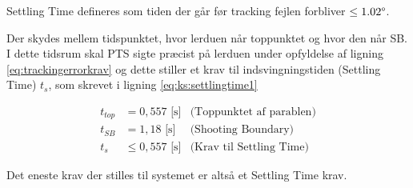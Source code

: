 Settling Time defineres som tiden der går før tracking fejlen forbliver \(\leq 1.02 \degree\).

Der skydes mellem tidspunktet, hvor lerduen når toppunktet og hvor den når SB.
I dette tidsrum skal PTS sigte præcist på lerduen under opfyldelse af ligning \ref{eq:trackingerrorkrav} og dette 
stiller et krav til indsvingningstiden (Settling Time) \(t_s\), som skrevet i ligning \ref{eq:ks:settlingtime1}

\begin{align}
  t_{top} &= 0,557\text{ [s]} &\text{(Toppunktet af parablen)}
  \label{eq:ks:toppunktstid}
  \\
   t_{SB} &= 1,18\text{ [s]} &\text{(Shooting Boundary)}
  \label{eq:ks:toppunktstid}
  \\
  t_{s} & \leq 0,557\text{ [s]} &\text{(Krav til Settling Time)}
  \label{eq:ks:settlingtime1}
\end{align}

Det eneste krav der stilles til systemet er altså et Settling Time krav.

